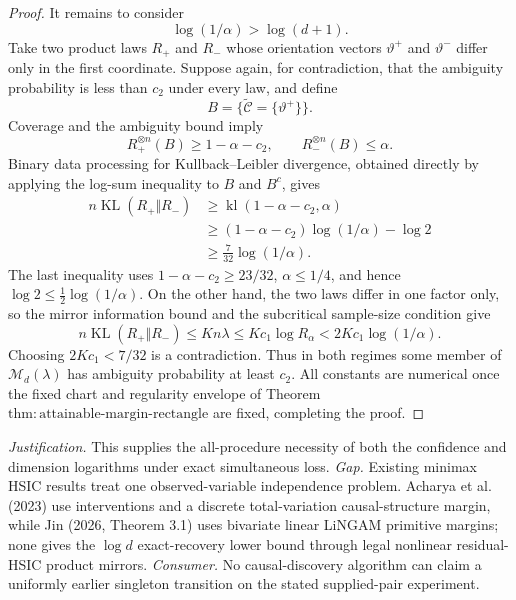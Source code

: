 \documentclass{article}
\begin{document}
\begin{proof}
It remains to consider
\[
\log(1/\alpha)>\log(d+1).
\]
Take two product laws \(R_+\) and \(R_-\) whose orientation vectors \(\vartheta^+\) and \(\vartheta^-\) differ only in the first coordinate.  Suppose again, for contradiction, that the ambiguity probability is less than \(c_2\) under every law, and define
\[
B=\{\widetilde{\mathcal C}=\{\vartheta^+\}\}.
\]
Coverage and the ambiguity bound imply
\[
R_+^{\otimes n}(B)\ge1-\alpha-c_2,\qquad
R_-^{\otimes n}(B)\le\alpha.
\]
Binary data processing for Kullback--Leibler divergence, obtained directly by applying the log-sum inequality to \(B\) and \(B^c\), gives
\[
\begin{aligned}
n\operatorname{KL}(R_+\Vert R_-)
&\ge \operatorname{kl}(1-\alpha-c_2,\alpha)\\
&\ge(1-\alpha-c_2)\log(1/\alpha)-\log2\\
&\ge\frac7{32}\log(1/\alpha).
\end{aligned}
\]
The last inequality uses \(1-\alpha-c_2\ge23/32\), \(\alpha\le1/4\), and hence \(\log2\le\frac12\log(1/\alpha)\).  On the other hand, the two laws differ in one factor only, so the mirror information bound and the subcritical sample-size condition give
\[
n\operatorname{KL}(R_+\Vert R_-)\le Kn\lambda
\le Kc_1\log R_\alpha<2Kc_1\log(1/\alpha).
\]
Choosing \(2Kc_1<7/32\) is a contradiction.  Thus in both regimes some member of \(\mathcal M_d(\lambda)\) has ambiguity probability at least \(c_2\).  All constants are numerical once the fixed chart and regularity envelope of Theorem \(\mathrm{thm:attainable\text{-}margin\text{-}rectangle}\) are fixed, completing the proof.
\end{proof}
\par\smallskip\noindent \textit{Justification.} This supplies the all-procedure necessity of both the confidence and dimension logarithms under exact simultaneous loss. \textit{Gap.} Existing minimax HSIC results treat one observed-variable independence problem. Acharya et al. (2023) use interventions and a discrete total-variation causal-structure margin, while Jin (2026, Theorem 3.1) uses bivariate linear LiNGAM primitive margins; none gives the \(\log d\) exact-recovery lower bound through legal nonlinear residual-HSIC product mirrors. \textit{Consumer.} No causal-discovery algorithm can claim a uniformly earlier singleton transition on the stated supplied-pair experiment.
\end{document}
